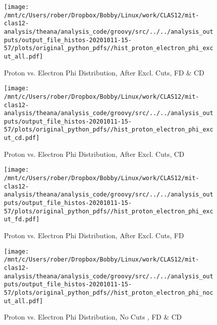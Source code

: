 \documentclass{article}
\begin{document}
\begin{landscape}
    \begin{figure}[h]
        \centering

        \texttt{[image: /mnt/c/Users/rober/Dropbox/Bobby/Linux/work/CLAS12/mit-clas12-analysis/theana/analysis\_code/groovy/src/../../analysis\_outputs/output\_file\_histos-20201011-15-57/plots/original\_python\_pdfs//hist\_proton\_electron\_phi\_excut\_all.pdf]}
        \captionsetup{textformat=empty,labelformat=blank}
        \caption{Proton vs. Electron Phi Distribution, After Excl. Cuts, FD \& CD}
    \end{figure}
    \clearpage
    
    \begin{figure}[h]
        \centering

        \texttt{[image: /mnt/c/Users/rober/Dropbox/Bobby/Linux/work/CLAS12/mit-clas12-analysis/theana/analysis\_code/groovy/src/../../analysis\_outputs/output\_file\_histos-20201011-15-57/plots/original\_python\_pdfs//hist\_proton\_electron\_phi\_excut\_cd.pdf]}
        \captionsetup{textformat=empty,labelformat=blank}
        \caption{Proton vs. Electron Phi Distribution, After Excl. Cuts, CD}
    \end{figure}
    \clearpage
    
    \begin{figure}[h]
        \centering

        \texttt{[image: /mnt/c/Users/rober/Dropbox/Bobby/Linux/work/CLAS12/mit-clas12-analysis/theana/analysis\_code/groovy/src/../../analysis\_outputs/output\_file\_histos-20201011-15-57/plots/original\_python\_pdfs//hist\_proton\_electron\_phi\_excut\_fd.pdf]}
        \captionsetup{textformat=empty,labelformat=blank}
        \caption{Proton vs. Electron Phi Distribution, After Excl. Cuts, FD}
    \end{figure}
    \clearpage
    
    \begin{figure}[h]
        \centering

        \texttt{[image: /mnt/c/Users/rober/Dropbox/Bobby/Linux/work/CLAS12/mit-clas12-analysis/theana/analysis\_code/groovy/src/../../analysis\_outputs/output\_file\_histos-20201011-15-57/plots/original\_python\_pdfs//hist\_proton\_electron\_phi\_nocut\_all.pdf]}
        \captionsetup{textformat=empty,labelformat=blank}
        \caption{Proton vs. Electron Phi Distribution, No Cuts , FD \& CD}
    \end{figure}
    \clearpage
    
    \begin{figure}[h]
        \centering


\end{figure}
\end{landscape}
\end{document}
